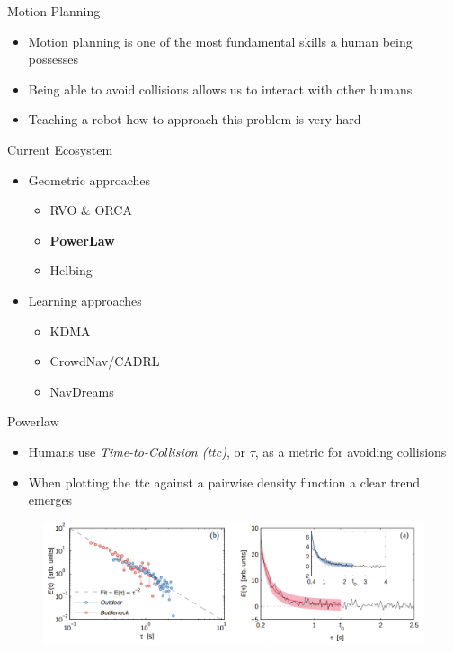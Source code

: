 \documentclass[aspectratio=169,xcolor=dvipsnames]{beamer}
\begin{document}
\begin{frame}{Motion Planning}
    \begin{itemize}
        \item Motion planning is one of the most fundamental skills a human being possesses
        \item Being able to avoid collisions allows us to interact with other humans
        \item Teaching a robot how to approach this problem is very hard
    \end{itemize}
\end{frame}

\begin{frame}{Current Ecosystem}
  \begin{itemize}
    \item Geometric approaches
    \begin{itemize}
      \item RVO \& ORCA
      \item \textbf{PowerLaw}
      \item Helbing
    \end{itemize}
    \item Learning approaches
    \begin{itemize}
      \item KDMA
      \item CrowdNav/CADRL
      \item NavDreams
    \end{itemize}
  \end{itemize}
\end{frame}

\begin{frame}{Powerlaw}
  \begin{itemize}
    \item Humans use \textit{Time-to-Collision (ttc)}, or $\tau$, as a metric for avoiding collisions
    \item When plotting the ttc against a pairwise density function a clear trend emerges
  \end{itemize}
  \begin{figure}
    \includegraphics[width=1.0\textwidth]{imgs/pl_graph.png}
  \end{figure}
\end{frame}
\end{document}
